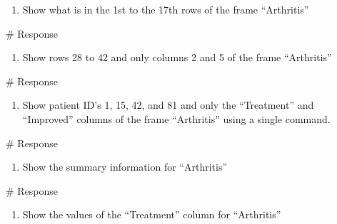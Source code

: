 \documentclass[
  letterpaper,
  DIV=11,
  numbers=noendperiod]{scrreprt}
\newenvironment{Shaded}{\begin{snugshade}}{\end{snugshade}}
\newcommand{\CommentTok}[1]{\textcolor[rgb]{0.37,0.37,0.37}{#1}}
\providecommand{\tightlist}{%
  \setlength{\itemsep}{0pt}\setlength{\parskip}{0pt}}\usepackage{longtable,booktabs,array}
\begin{document}
\begin{enumerate}
\def\labelenumi{\arabic{enumi}.}
\setcounter{enumi}{3}
\tightlist
\item
  Show what is in the 1st to the 17th rows of the frame ``Arthritis''
\end{enumerate}

\begin{Shaded}
\begin{Highlighting}[]
\CommentTok{\# Response}
\end{Highlighting}
\end{Shaded}

\begin{enumerate}
\def\labelenumi{\arabic{enumi}.}
\setcounter{enumi}{4}
\tightlist
\item
  Show rows 28 to 42 and only columns 2 and 5 of the frame ``Arthritis''
\end{enumerate}

\begin{Shaded}
\begin{Highlighting}[]
\CommentTok{\# Response}
\end{Highlighting}
\end{Shaded}

\begin{enumerate}
\def\labelenumi{\arabic{enumi}.}
\setcounter{enumi}{5}
\tightlist
\item
  Show patient ID's 1, 15, 42, and 81 and only the ``Treatment'' and
  ``Improved'' columns of the frame ``Arthritis'' using a single
  command.
\end{enumerate}

\begin{Shaded}
\begin{Highlighting}[]
\CommentTok{\# Response}
\end{Highlighting}
\end{Shaded}

\begin{enumerate}
\def\labelenumi{\arabic{enumi}.}
\setcounter{enumi}{6}
\tightlist
\item
  Show the summary information for ``Arthritis''
\end{enumerate}

\begin{Shaded}
\begin{Highlighting}[]
\CommentTok{\# Response}
\end{Highlighting}
\end{Shaded}

\begin{enumerate}
\def\labelenumi{\arabic{enumi}.}
\setcounter{enumi}{7}
\tightlist
\item
  Show the values of the ``Treatment'' column for ``Arthritis''
\end{enumerate}
\end{document}
